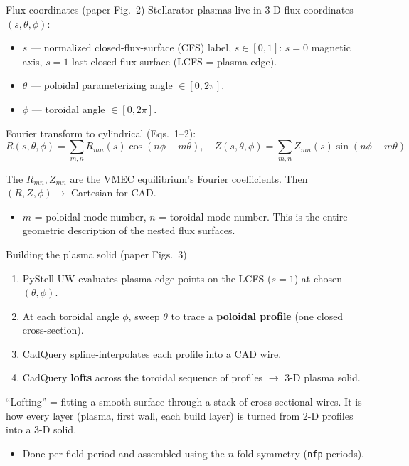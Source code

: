 \documentclass[aspectratio=169]{beamer}
\newcommand{\kb}[1]{\begin{tcolorbox}[colback=key!5,colframe=key!60,boxsep=2pt,left=4pt,right=4pt,top=3pt,bottom=3pt]#1\end{tcolorbox}}
\begin{document}
\begin{frame}{Flux coordinates (paper Fig.~2)}
  Stellarator plasmas live in 3-D flux coordinates $(s,\theta,\phi)$:
  \begin{itemize}
    \item $s$ --- normalized closed-flux-surface (CFS) label, $s\in[0,1]$: $s=0$ magnetic axis, $s=1$ last closed flux surface (LCFS = plasma edge).
    \item $\theta$ --- poloidal parameterizing angle $\in[0,2\pi]$.
    \item $\phi$ --- toroidal angle $\in[0,2\pi]$.
  \end{itemize}
  \kb{Fourier transform to cylindrical (Eqs.~1--2):
  \[ R(s,\theta,\phi)=\sum_{m,n} R_{mn}(s)\cos(n\phi-m\theta), \quad
     Z(s,\theta,\phi)=\sum_{m,n} Z_{mn}(s)\sin(n\phi-m\theta) \]}
  The $R_{mn},Z_{mn}$ are the VMEC equilibrium's Fourier coefficients. Then $(R,Z,\phi)\to$ Cartesian for CAD.
  \begin{itemize}\small
    \item $m$ = poloidal mode number, $n$ = toroidal mode number. This is the entire geometric description of the nested flux surfaces.
  \end{itemize}
\end{frame}

\begin{frame}{Building the plasma solid (paper Figs.~3)}
  \begin{enumerate}
    \item PyStell-UW evaluates plasma-edge points on the LCFS ($s=1$) at chosen $(\theta,\phi)$.
    \item At each toroidal angle $\phi$, sweep $\theta$ to trace a \textbf{poloidal profile} (one closed cross-section).
    \item CadQuery spline-interpolates each profile into a CAD wire.
    \item CadQuery \textbf{lofts} across the toroidal sequence of profiles $\to$ 3-D plasma solid.
  \end{enumerate}
  \vspace{0.4em}
  \kb{``Lofting'' = fitting a smooth surface through a stack of cross-sectional wires. It is how every layer (plasma, first wall, each build layer) is turned from 2-D profiles into a 3-D solid.}
  \begin{itemize}\small
    \item Done per field period and assembled using the $n$-fold symmetry (\texttt{nfp} periods).
  \end{itemize}
\end{frame}
\end{document}
